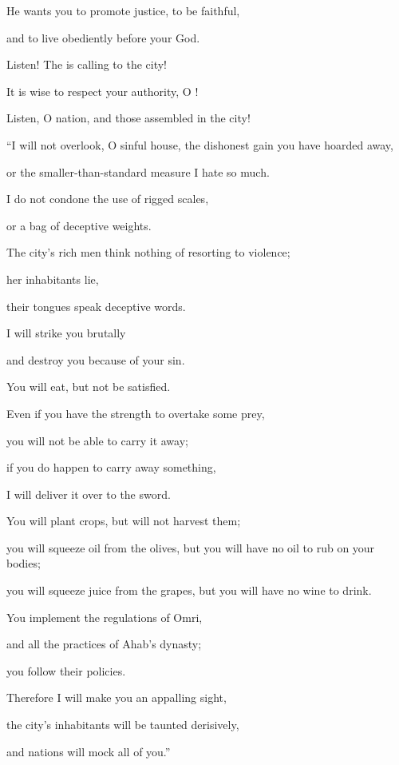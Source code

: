 {\par }{\Q He wants you to promote
justice,
to be faithful,
\par }{\Q and to live
obediently
before your God.
\par }{\Q {}Listen! The
{}
is calling
to the city!
\par }{\Q It is wise
to respect
your authority,
O
{}!

\par }{\Q Listen,
O nation,
and those
assembled in the city!
\par }{\Q {}“I will
not overlook, O sinful
house,
the dishonest
gain
you have hoarded away,

\par }{\Q or the smaller-than-standard
measure
I hate so much.
\par }{\Q {}I
do
not condone
the use of rigged
scales,
\par }{\Q or a bag
of deceptive
weights.
\par }{\Q {}The city’s rich
men think nothing of resorting
to violence;
\par }{\Q her inhabitants
lie,
\par }{\Q their tongues
speak
deceptive
words.
\par }{\Q {}I
will strike
you brutally
\par }{\Q and destroy
you because
of your sin.
\par }{\Q {}You
will eat,
but not
be satisfied.
\par }{\Q Even if you have
the strength to overtake
some
prey,

\par }{\Q you will not
be able to carry
it
away;
\par }{\Q if you do happen to carry away
something,
\par }{\Q I will deliver
it over to the sword.
\par }{\Q {}You
will plant
crops, but will not
harvest
them;
\par }{\Q you
will squeeze
oil from the olives,
but you will have no
oil
to rub
on your bodies;

\par }{\Q you will squeeze juice
from the grapes, but you will have no
wine
to drink.
\par }{\Q {}You implement
the regulations
of Omri,
\par }{\Q and all
the practices
of Ahab’s
dynasty;
\par }{\Q you follow
their policies.
\par }{\Q Therefore I will make
you an appalling sight,
\par }{\Q the city’s inhabitants
will be taunted
derisively,
\par }{\Q and nations
will mock all of you.”

}

